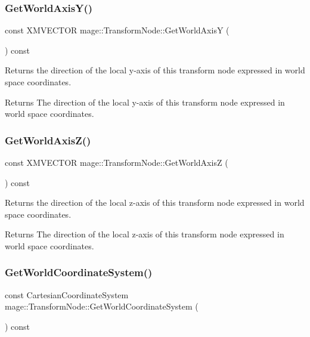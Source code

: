 \subsubsection{\texorpdfstring{Get\+World\+Axis\+Y()}{GetWorldAxisY()}}
{\footnotesize\ttfamily const X\+M\+V\+E\+C\+T\+OR mage\+::\+Transform\+Node\+::\+Get\+World\+AxisY (\begin{DoxyParamCaption}{ }\end{DoxyParamCaption}) const}

Returns the direction of the local y-\/axis of this transform node expressed in world space coordinates.

\begin{DoxyReturn}{Returns}
The direction of the local y-\/axis of this transform node expressed in world space coordinates. 
\end{DoxyReturn}
\hypertarget{classmage_1_1_transform_node_a932c9e84dd8b48d634d7c9f7315100e1}{}\label{classmage_1_1_transform_node_a932c9e84dd8b48d634d7c9f7315100e1} 
\subsubsection{\texorpdfstring{Get\+World\+Axis\+Z()}{GetWorldAxisZ()}}
{\footnotesize\ttfamily const X\+M\+V\+E\+C\+T\+OR mage\+::\+Transform\+Node\+::\+Get\+World\+AxisZ (\begin{DoxyParamCaption}{ }\end{DoxyParamCaption}) const}

Returns the direction of the local z-\/axis of this transform node expressed in world space coordinates.

\begin{DoxyReturn}{Returns}
The direction of the local z-\/axis of this transform node expressed in world space coordinates. 
\end{DoxyReturn}
\hypertarget{classmage_1_1_transform_node_ae0347c5fe22cd16da1c6ff727275892d}{}\label{classmage_1_1_transform_node_ae0347c5fe22cd16da1c6ff727275892d} 
\subsubsection{\texorpdfstring{Get\+World\+Coordinate\+System()}{GetWorldCoordinateSystem()}}
{\footnotesize\ttfamily const Cartesian\+Coordinate\+System mage\+::\+Transform\+Node\+::\+Get\+World\+Coordinate\+System (\begin{DoxyParamCaption}{ }\end{DoxyParamCaption}) const}


